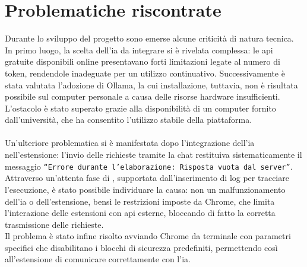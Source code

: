 \section{Problematiche riscontrate}
\noindent Durante lo sviluppo del progetto sono emerse alcune criticità di natura tecnica. In primo luogo, la scelta dell’\acrshort{ia} da integrare si è rivelata complessa: le \acrshort{api} gratuite disponibili online presentavano forti limitazioni legate al numero di token, rendendole inadeguate per un utilizzo continuativo. Successivamente è stata valutata l’adozione di Ollama, la cui installazione, tuttavia, non è risultata possibile sul computer personale a causa delle risorse hardware insufficienti. L’ostacolo è stato superato grazie alla disponibilità di un computer fornito dall’università, che ha consentito l’utilizzo stabile della piattaforma.\\\\
Un’ulteriore problematica si è manifestata dopo l’integrazione dell’\acrshort{ia} nell’estensione: l’invio delle richieste tramite la chat restituiva sistematicamente il messaggio \texttt{“Errore durante l’elaborazione: Risposta vuota dal server”}. Attraverso un’attenta fase di , supportata dall’inserimento di log per tracciare l’esecuzione, è stato possibile individuare la causa: non un malfunzionamento dell’\acrshort{ia} o dell'estensione, bensì le restrizioni imposte da Chrome, che limita l’interazione delle estensioni con \acrshort{api} esterne, bloccando di fatto la corretta trasmissione delle richieste.\\Il problema è stato infine risolto avviando Chrome da terminale con parametri specifici che disabilitano i blocchi di sicurezza predefiniti, permettendo così all’estensione di comunicare correttamente con l’\acrshort{ia}.
